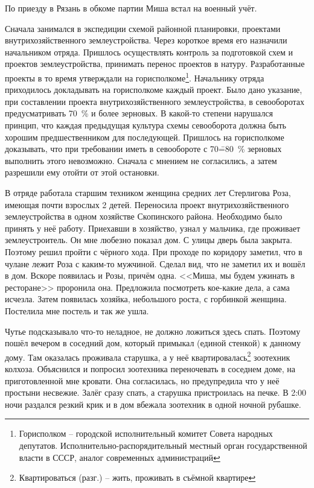 По приезду в Рязань в обкоме партии Миша встал на военный учёт.

Сначала занимался в экспедиции схемой районной планировки, проектами внутрихозяйственного землеустройства. Через короткое время его назначили начальником отряда. Пришлось осуществлять контроль за подготовкой схем и проектов землеустройства, принимать перенос проектов в натуру. Разработанные проекты в то время утверждали на горисполкоме\footnote{Горисполком \--- городской исполнительный комитет Совета народных депутатов. Исполнительно-распорядительный местный орган государственной власти в СССР, аналог современных администраций}. Начальнику отряда приходилось докладывать на горисполкоме каждый проект. Было дано указание, при составлении проекта внутрихозяйственного землеустройства, в севооборотах предусматривать 70 \% и более зерновых. В какой-то степени нарушался принцип, что каждая предыдущая культура схемы севооборота должна быть хорошим предшественником для последующей. Пришлось на горисполкоме доказывать, что при требовании иметь в севообороте с 70\==80 \% зерновых выполнить этого невозможно. Сначала с мнением не согласились, а затем разрешили ему отойти от этой остановки.

В отряде работала старшим техником женщина средних лет Стерлигова Роза, имеющая почти взрослых 2 детей. Переносила проект внутрихозяйственного землеустройства в одном хозяйстве Скопинского района. Необходимо было принять у неё работу. Приехавши в хозяйство, узнал у мальчика, где проживает землеустроитель. Он мне любезно показал дом. С улицы дверь была закрыта. Поэтому решил пройти с чёрного хода. При проходе по коридору заметил, что в чулане лежит Роза с каким-то мужчиной. Сделал вид, что не заметил их и вошёл в дом. Вскоре появилась и Розы, причём одна. <<Миша, мы будем ужинать в ресторане>> проронила она. Предложила посмотреть кое-какие дела, а сама исчезла. Затем появилась хозяйка, небольшого роста, с горбинкой женщина. Постелила мне постель и так же ушла. 

Чутье подсказывало что-то неладное, не должно ложиться здесь спать. Поэтому пошёл вечером в соседний дом, который примыкал (единой стенкой) к данному дому. Там оказалась проживала старушка, а у неё квартировалась\footnote{Квартироваться (разг.) \--- жить, проживать в съёмной квартире} зоотехник колхоза. Объяснился и попросил зоотехника переночевать в соседнем доме, на приготовленной мне кровати. Она согласилась, но предупредила что у неё простыни несвежие. Залёг сразу спать, а старушка пристроилась на печке. В 2:00 ночи раздался резкий крик и в дом вбежала зоотехник в одной ночной рубашке. 

